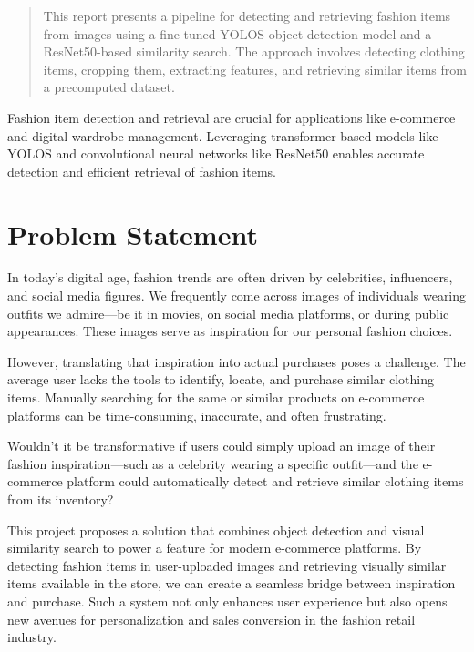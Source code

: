 
\vspace{-1em}
\begin{center}
\begin{minipage}{0.6\textwidth}
\begin{abstract}
This report presents a pipeline for detecting and retrieving fashion items from images using a fine-tuned YOLOS object detection model and a ResNet50-based similarity search. The approach involves detecting clothing items, cropping them, extracting features, and retrieving similar items from a precomputed dataset.
\end{abstract}
\end{minipage}
\end{center}

Fashion item detection and retrieval are crucial for applications like e-commerce and digital wardrobe management. Leveraging transformer-based models like YOLOS and convolutional neural networks like ResNet50 enables accurate detection and efficient retrieval of fashion items.

\section*{Problem Statement}

In today's digital age, fashion trends are often driven by celebrities, influencers, and social media figures. We frequently come across images of individuals wearing outfits we admire—be it in movies, on social media platforms, or during public appearances. These images serve as inspiration for our personal fashion choices.

However, translating that inspiration into actual purchases poses a challenge. The average user lacks the tools to identify, locate, and purchase similar clothing items. Manually searching for the same or similar products on e-commerce platforms can be time-consuming, inaccurate, and often frustrating.

Wouldn't it be transformative if users could simply upload an image of their fashion inspiration—such as a celebrity wearing a specific outfit—and the e-commerce platform could automatically detect and retrieve similar clothing items from its inventory?

This project proposes a solution that combines object detection and visual similarity search to power a feature for modern e-commerce platforms. By detecting fashion items in user-uploaded images and retrieving visually similar items available in the store, we can create a seamless bridge between inspiration and purchase. Such a system not only enhances user experience but also opens new avenues for personalization and sales conversion in the fashion retail industry.

